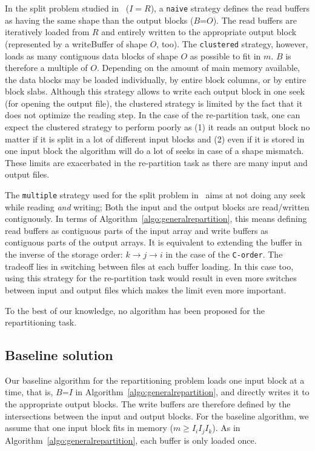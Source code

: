 \documentclass[conference]{IEEEtran}
\begin{document}
In the split problem studied in~\cite{seqalgorithms} ($I=R$), a \texttt{naive}
strategy defines the read buffers as having the same shape than the output blocks
($B$=$O$). The read buffers are iteratively loaded from $R$ and entirely written
to the appropriate output block (represented by a writeBuffer of shape $O$, too).
The \texttt{clustered} strategy, however, loads as
many contiguous data blocks of shape $O$ as possible to fit in $m$.
$B$ is therefore a multiple of $O$.
Depending on the amount of main memory available, the data blocks may be loaded
individually, by entire block columns, or by entire block slabs.
Although this strategy allows to write each output block in one seek
(for opening the output file), the clustered strategy is limited by the fact
that it does not optimize the reading step.
In the case of the re-partition task, one can expect the clustered strategy to
perform poorly as
(1) it reads an output block no matter if it is split in a lot of different input blocks
and (2) even if it is stored in one input block the algorithm will do a lot of seeks in
case of a shape mismatch.
These limits are exacerbated in the re-partition task as there are many input and
output files.

The \texttt{multiple} strategy used for the split problem in~\cite{seqalgorithms}
aims at not doing any seek while reading \textit{and} writing;
Both the input and the output blocks are read/written contiguously. In
terms of Algorithm~\ref{algo:generalrepartition}, this means defining read buffers as
contiguous parts of the input array and write buffers as contiguous parts of
the output arrays. It is equivalent to extending the buffer in the inverse of
the storage order: $k \rightarrow j \rightarrow i$ in the case
of the \texttt{C-order}. The tradeoff lies in switching between files
at each buffer loading. In this case too, using this strategy for the re-partition task would
result in even more switches between input and output files which makes the limit
even more important.

To the best of our knowledge, no algorithm has been proposed for the
repartitioning task.

\subsection{Baseline solution}

Our baseline algorithm for the repartitioning problem loads one input block
at a time, that is, $B$=$I$ in Algorithm~\ref{algo:generalrepartition},
and directly writes it to the appropriate output blocks.
The write buffers are therefore defined by the intersections between the input
and output blocks.
For the baseline algorithm, we assume that one input block fits in memory ($m \geq I_iI_jI_k$).
As in Algorithm~\ref{algo:generalrepartition}, each buffer is only loaded once.
\end{document}
